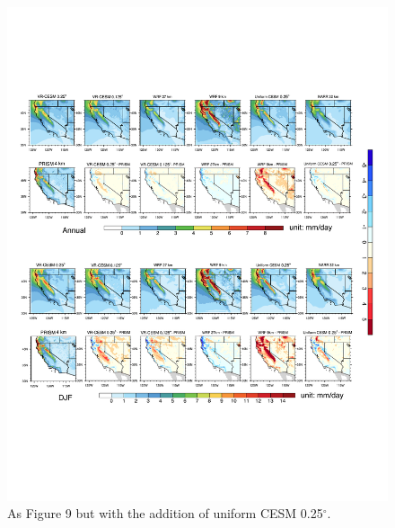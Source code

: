 \begin{figure}
\begin{center}
\includegraphics[width=6in]{supplement/pr_DJF_Annual_with_uniform_CESM.pdf}
\caption{As Figure 9 but with the addition of uniform CESM 0.25$^\circ$.}
\end{center}
\end{figure}


